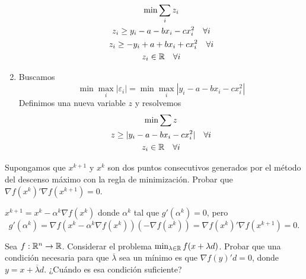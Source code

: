 \documentclass[twoside]{article}
\begin{document}
\begin{ejercicio}{1}
\begin{solucion}
\begin{enumerate}
\begin{gather*}
\min \sum_i z_i\\
z_i\geq y_i -a-bx_i-c x_i^2 \quad \forall i \\
z_i\geq -y_i +a+bx_i+c x_i^2 \quad \forall i\\
z_i \in \mathbb{R} \quad \forall i
\end{gather*}
\item Buscamos
$$
\min \max_i |\varepsilon_i| = \min \max_i |y_i -a-bx_i-c x_i^2|
$$
Definimos una nueva variable $z$ y resolvemos
\begin{gather*}
\min \sum z\\
z\geq |y_i -a-bx_i-c x_i^2| \quad \forall i\\
z_i \in \mathbb{R} \quad \forall i
\end{gather*}
\end{enumerate}
\end{solucion}
\end{ejercicio}

\newpage 

\begin{ejercicio}{2}
Supongamos que $x^{k+1}$ y $x^k$ son dos puntos consecutivos generados por el método del descenso máximo con la regla de minimización. Probar que $\nabla f(x^{k})'\nabla f(x^{k+1})=0$.
\end{ejercicio}
\begin{solucion}
$x^{k+1}=x^k-\alpha^k\nabla f(x^k)$ donde $\alpha^k$ tal que $g'(\alpha^k)=0$, pero $$g'(\alpha^k)=\nabla f(x^k-\alpha^k\nabla f(x^k))(-\nabla f(x^k))=\nabla f(x^{k})'\nabla f(x^{k+1})=0.$$
\end{solucion}

\newpage

\begin{ejercicio}{3}
Sea $f:\mathbb{R}^n\to\mathbb{R}$. Considerar el problema $\min_{\lambda\in\mathbb{R}}f(x+\lambda d)$. Probar que una condición necesaria para que $\overline{\lambda}$ sea un mínimo es que $\nabla f(y)'d=0$, donde $y=x+\overline{\lambda}d$. ¿Cuándo es esa condición suficiente?
\end{ejercicio}

\newpage
\end{document}

